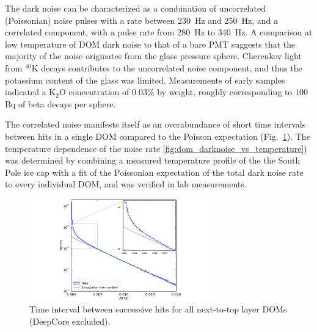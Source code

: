 The dark noise can be characterized as a combination of uncorrelated
(Poissonian) noise pulses with a rate between \SI{230}{\hertz} and
\SI{250}{\hertz}, and a correlated component, with a pulse rate from
\SI{280}{\hertz} to \SI{340}{\hertz}.  A comparison at low temperature of
DOM dark noise to that of a bare PMT suggests that the majority of the
noise originates from the glass pressure sphere.  Cherenkov light from
$^{40}\mathrm{K}$ decays contributes to the uncorrelated noise component,
and thus the potassium content of the glass was limited.
Measurements of early samples indicated a $\mathrm{K}_2\mathrm{O}$
concentration of 0.03\% by weight, roughly corresponding to 100 Bq of beta
decays per sphere. 

The correlated noise manifests itself as an overabundance of short time
intervals between hits in a single DOM compared to the Poisson expectation
(Fig.~\ref{fig:darknoise_deltaT}). 
The temperature dependence of the noise rate
\ref{fig:dom_darknoise_vs_temperature}) was determined by combining a
measured temperature profile of 
the the South Pole ice cap \cite{price2002temperature} with a fit of the
Poissonian expectation of the total dark noise rate to every individual
DOM, and was verified in lab measurements.  

\begin{figure}
  \centering
  \includegraphics[width=0.7\textwidth]{graphics/dom/performance/darknoise/DarkNoise_Layer2Doms.pdf}
 \caption{Time interval between successive hits for all next-to-top layer DOMs (DeepCore excluded).}
 \label{fig:darknoise_deltaT}
\end{figure}

